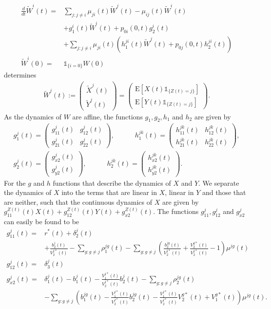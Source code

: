 \documentclass[12pt]{article}
\newcommand{\E}{\text{E}}
\newcommand{\indic}[1]{\mathds{1}_{ \{ #1 \} }}
\theoremstyle{my_thm}
\begin{document}
\begin{align*}
\frac{d}{dt}\tilde{W}^i(t)=&
\sum_{j:j \neq i} \mu_{ji}(t) \tilde{W}^j(t)-\mu_{ij}(t)\tilde{W}^i(t)
 \\
&+
g_1^i(t) \tilde{W}^i(t) +p_{0i}(0,t)g_2^i(t)
\\
&+
\sum_{j:j\neq i} \mu_{ji}(t) \left( h_1^{ji}(t) \tilde{W}^j(t)  + p_{0j}(0,t)h_2^{ji}(t)\right) 
\\
\tilde{W}^i(0)=&\indic{i=0}W(0) 
\end{align*}
determines
\begin{align*}
\tilde{W}^j(t):=
\begin{pmatrix}
\tilde{X}^j(t) \\
\tilde{Y}^j(t)
\end{pmatrix}
=
\begin{pmatrix}
\E[ X(t) \indic{Z(t)=j}] \\
\E[ Y(t) \indic{Z(t)=j}]
\end{pmatrix}.
\end{align*}
As the dynamics of $W$ are affine, the functions $g_1,g_2,h_1$ and $h_2$ are given by
\begin{gather*}
g^j_1(t)=\begin{pmatrix}
g^j_{11}(t) & g^j_{12}(t) \\
g^j_{21}(t) & g^j_{22}(t)
\end{pmatrix},
\qquad 
\quad
h^{jk}_1(t)=\begin{pmatrix}
h^{jk}_{11}(t) & h^{jk}_{12}(t) \\
h^{jk}_{21}(t) & h^{jk}_{22}(t)
\end{pmatrix},
\\
g_2^j(t)=\begin{pmatrix}
g^j_{x2}(t) \\
g^j_{y2}(t)
\end{pmatrix},
\qquad 
\quad
h^{jk}_2(t)=\begin{pmatrix}
h^{jk}_{x2}(t) \\
h^{jk}_{y2}(t)
\end{pmatrix}.
\end{gather*}
For the $g$ and $h$ functions that describe the dynamics of $X$ and $Y$. We separate the dynamics of $X$ into the terms that are linear in $X$, linear in $Y$ and those that are neither, such that the continuous dynamics of $X$ are given by $g_{11}^{Z(t)}(t)X(t)+g_{12}^{Z(t)}(t)Y(t)+g_{x2}^{Z(t)}(t)$. The functions $g^j_{11},g^j_{12}$ and $g_{x2}^j$ can easily be found to be
\begin{align*}
g^j_{11}(t)=&r^*(t)  +\delta_2^j(t)\\
&+\frac{b^j_2(t)}{V_2^{j*}(t)}
-\sum_{g:g \neq j} \rho_1^{jg}(t)
-\sum_{g:g \neq j} \left(\frac{b^{jg}_2(t)}{V_2^{j*}(t)} + \frac{V^{g*}_2(t)}{V^{j*}_2(t)}-1 \right) \mu^{jg}(t)
\\
g^j_{12}(t)=&\delta_3^j(t)
\\
g^j_{x2}(t)=& \delta_1^j(t)
-b_1^j(t)
-\frac{V_1^{j*}(t)}{V_2^{j*}(t)}b^j_2(t)
-\sum_{g:g \neq j} \rho_2^{jg}(t)
\\
&-\sum_{g:g \neq j} \left( b_1^{jg}(t)-\frac{V_1^{j*}(t)}{V_2^{j*}(t)}b^{jg}_2(t) -\frac{V^{j*}_1(t)}{V^{j*}_2(t)}V^{g*}_2(t)+V^{g*}_1(t) \right) \mu^{jg}(t).
\end{align*}
\end{document}
